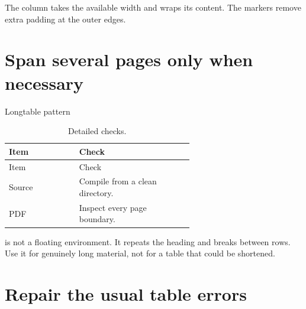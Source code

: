 
The  column takes the available width and wraps its content. The
 markers remove extra padding at the outer edges.

\section{Span several pages only when necessary}

\begin{latexcode}{Longtable pattern}
\usepackage{booktabs,longtable}

\begin{longtable}{@{}lp{0.62\linewidth}@{}}
\caption{Detailed checks.}\label{tab:checks}\\
\toprule
Item & Check \\
\midrule
\endfirsthead
\toprule
Item & Check \\
\midrule
\endhead
Source & Compile from a clean directory. \\
PDF & Inspect every page boundary. \\
\bottomrule
\end{longtable}
\end{latexcode}

 is not a floating environment. It repeats the heading and
breaks between rows. Use it for genuinely long material, not for a table that
could be shortened.

\section{Repair the usual table errors}

